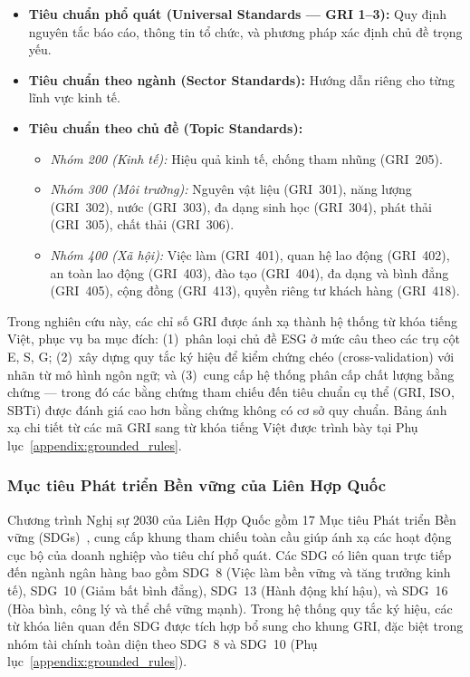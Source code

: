 \begin{itemize}
    \item \textbf{Tiêu chuẩn phổ quát (Universal Standards --- GRI 1--3):} Quy định nguyên tắc báo cáo, thông tin tổ chức, và phương pháp xác định chủ đề trọng yếu.
    \item \textbf{Tiêu chuẩn theo ngành (Sector Standards):} Hướng dẫn riêng cho từng lĩnh vực kinh tế.
    \item \textbf{Tiêu chuẩn theo chủ đề (Topic Standards):}
    \begin{itemize}
        \item \textit{Nhóm 200 (Kinh tế):} Hiệu quả kinh tế, chống tham nhũng (GRI~205).
        \item \textit{Nhóm 300 (Môi trường):} Nguyên vật liệu (GRI~301), năng lượng (GRI~302), nước (GRI~303), đa dạng sinh học (GRI~304), phát thải (GRI~305), chất thải (GRI~306).
        \item \textit{Nhóm 400 (Xã hội):} Việc làm (GRI~401), quan hệ lao động (GRI~402), an toàn lao động (GRI~403), đào tạo (GRI~404), đa dạng và bình đẳng (GRI~405), cộng đồng (GRI~413), quyền riêng tư khách hàng (GRI~418).
    \end{itemize}
\end{itemize}

Trong nghiên cứu này, các chỉ số GRI được ánh xạ thành hệ thống từ khóa tiếng Việt, phục vụ ba mục đích: (1)~phân loại chủ đề ESG ở mức câu theo các trụ cột E, S, G; (2)~xây dựng quy tắc ký hiệu để kiểm chứng chéo (cross-validation) với nhãn từ mô hình ngôn ngữ; và (3)~cung cấp hệ thống phân cấp chất lượng bằng chứng --- trong đó các bằng chứng tham chiếu đến tiêu chuẩn cụ thể (GRI, ISO, SBTi) được đánh giá cao hơn bằng chứng không có cơ sở quy chuẩn. Bảng ánh xạ chi tiết từ các mã GRI sang từ khóa tiếng Việt được trình bày tại Phụ lục~\ref{appendix:grounded_rules}.


\subsubsection{Mục tiêu Phát triển Bền vững của Liên Hợp Quốc}

Chương trình Nghị sự 2030 của Liên Hợp Quốc gồm 17 Mục tiêu Phát triển Bền vững (SDGs)~\cite{un_sdgs_2015}, cung cấp khung tham chiếu toàn cầu giúp ánh xạ các hoạt động cục bộ của doanh nghiệp vào tiêu chí phổ quát. Các SDG có liên quan trực tiếp đến ngành ngân hàng bao gồm SDG~8 (Việc làm bền vững và tăng trưởng kinh tế), SDG~10 (Giảm bất bình đẳng), SDG~13 (Hành động khí hậu), và SDG~16 (Hòa bình, công lý và thể chế vững mạnh). Trong hệ thống quy tắc ký hiệu, các từ khóa liên quan đến SDG được tích hợp bổ sung cho khung GRI, đặc biệt trong nhóm tài chính toàn diện theo SDG~8 và SDG~10 (Phụ lục~\ref{appendix:grounded_rules}).


